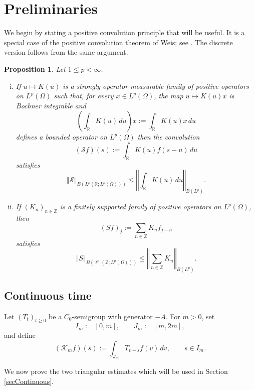 \documentclass[12pt]{amsart}
\theoremstyle{plain}
\newtheorem{prop}[thm]{Proposition}
\theoremstyle{remark}
\theoremstyle{definition}
\newcommand{\R}{\mathbb{R}}
\newcommand{\Z}{\mathbb{Z}}
\newcommand{\norm}[1]{\left\Vert #1\right\Vert}
\begin{document}
	\section{Preliminaries}\label{sec:prelim}
	We begin by stating a positive convolution principle that will be useful. It is a 
	special case of the positive convolution theorem of Weis; see
	\cite[Theorem 2]{Weis1998}. The discrete version follows from the same argument.
	\begin{prop}\label{prop:positive-convolution}
		Let $1\le p<\infty$.
		\begin{enumerate}[(i)]
			\item If $u\mapsto K(u)$ is a strongly operator measurable family of positive
			operators on $L^p(\Omega)$ such that, for every $x\in L^p(\Omega)$, the map
			$u\mapsto K(u)x$ is Bochner integrable and
			\[
			\left(\int_\R K(u)\,du \right) x:=\int_{\R}K(u)x\,du
			\]
			defines a bounded operator on  $L^p(\Omega)$ then the convolution
			\[
			(\mathcal S f)(s):=\int_\R K(u)f(s-u)\,du
			\]
			satisfies
			\[
			\norm{\mathcal S}_{B(L^p(\R;L^p(\Omega)))}\le \norm{\int_\R K(u)\,du}_{B(L^p)}.
			\]
			\item If $(K_n)_{n\in\Z}$ is a finitely supported family of positive operators on $L^p(\Omega)$, then
			\[
			(S f)_j:=\sum_{n\in\Z}K_n f_{j-n}
			\]
			satisfies
			\[
			\norm{S}_{B(\ell^p(\Z;L^p(\Omega)))}\le \norm{\sum_{n\in\Z}K_n}_{B(L^p)}.
			\]
		\end{enumerate}
	\end{prop}
	
	
	\subsection{Continuous time}\label{sec:prelim-continuous}
	
	Let $(T_t)_{t\ge0}$ be a $C_0$-semigroup with generator $-A$. For
	$m>0$, set
	\[
	I_m:=[0,m],
	\qquad
	J_m:=[m,2m],
	\]
	and define 
	\begin{equation*}\label{eqDefKmContinuous}
		(\mathcal K_mf)(s)
		:=
		\int_{J_m}T_{v-s}f(v)\,dv,
		\qquad s\in I_m.
	\end{equation*}
	
	We now prove the two triangular estimates which will be used in
	Section \ref{secContinuous}.
	
\end{document}
